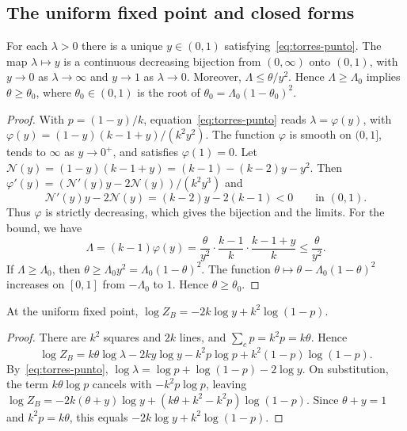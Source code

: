 \subsection{The uniform fixed point and closed forms}

\begin{lema}\label{lem:torres-punto}
For each $\lambda>0$ there is a unique $y\in(0,1)$ satisfying~\eqref{eq:torres-punto}. The map
$\lambda\mapsto y$ is a continuous decreasing bijection from $(0,\infty)$ onto $(0,1)$, with $y\to0$ as
$\lambda\to\infty$ and $y\to1$ as $\lambda\to0$. Moreover, $\Lambda\le\theta/y^2$. Hence
$\Lambda\ge\Lambda_0$ implies $\theta\ge\theta_0$, where $\theta_0\in(0,1)$ is the root of
$\theta_0=\Lambda_0(1-\theta_0)^2$.
\end{lema}
\begin{proof}
With $p=(1-y)/k$, equation~\eqref{eq:torres-punto} reads $\lambda=\varphi(y)$, with
$\varphi(y)=(1-y)(k-1+y)/(k^2y^2)$. The function $\varphi$ is smooth on $(0,1]$, tends to $\infty$ as
$y\to0^+$, and satisfies $\varphi(1)=0$. Let $\mathcal N(y)=(1-y)(k-1+y)=(k-1)-(k-2)y-y^2$. Then
$\varphi'(y)=(\mathcal N'(y)y-2\mathcal N(y))/(k^2y^3)$ and
\[
 \mathcal N'(y)y-2\mathcal N(y)=(k-2)y-2(k-1)<0\qquad\text{in }(0,1).
\]
Thus $\varphi$ is strictly decreasing, which gives the bijection and the limits. For the bound, we have
\[
 \Lambda=(k-1)\varphi(y)=\frac{\theta}{y^2}\cdot\frac{k-1}k\cdot\frac{k-1+y}k\le\frac\theta{y^2}.
\]
If $\Lambda\ge\Lambda_0$, then $\theta\ge\Lambda_0y^2=\Lambda_0(1-\theta)^2$. The function
$\theta\mapsto\theta-\Lambda_0(1-\theta)^2$ increases on $[0,1]$ from $-\Lambda_0$ to $1$. Hence
$\theta\ge\theta_0$.
\end{proof}

\begin{lema}\label{lem:torres-arbol}
At the uniform fixed point, $\log Z_B=-2k\log y+k^2\log(1-p)$.
\end{lema}
\begin{proof}
There are $k^2$ squares and $2k$ lines, and $\sum_cp=k^2p=k\theta$. Hence
\[
 \log Z_B=k\theta\log\lambda-2ky\log y-k^2p\log p+k^2(1-p)\log(1-p).
\]
By~\eqref{eq:torres-punto}, $\log\lambda=\log p+\log(1-p)-2\log y$. On substitution, the term
$k\theta\log p$ cancels with $-k^2p\log p$, leaving
$\log Z_B=-2k(\theta+y)\log y+(k\theta+k^2-k^2p)\log(1-p)$. Since $\theta+y=1$ and $k^2p=k\theta$, this
equals
$-2k\log y+k^2\log(1-p)$.
\end{proof}

